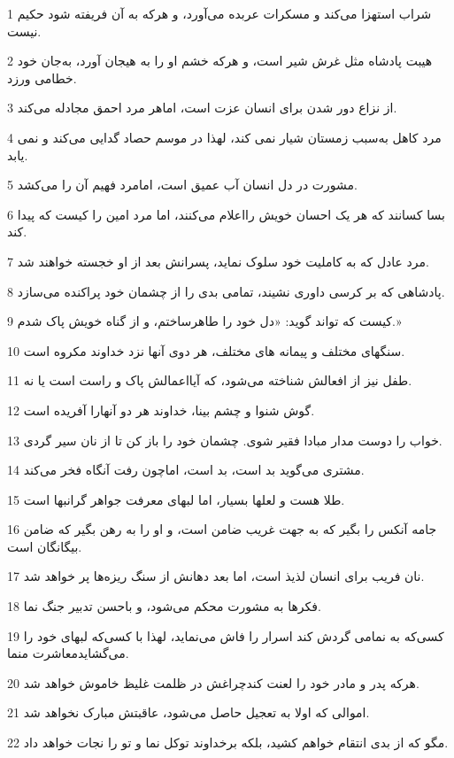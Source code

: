 \par 1 شراب استهزا می‌کند و مسکرات عربده می‌آورد، و هر‌که به آن فریفته شود حکیم نیست.
\par 2 هیبت پادشاه مثل غرش شیر است، و هر‌که خشم او را به هیجان آورد، به‌جان خود خطامی ورزد.
\par 3 از نزاع دور شدن برای انسان عزت است، اماهر مرد احمق مجادله می‌کند.
\par 4 مرد کاهل به‌سبب زمستان شیار نمی کند، لهذا در موسم حصاد گدایی می‌کند و نمی یابد.
\par 5 مشورت در دل انسان آب عمیق است، امامرد فهیم آن را می‌کشد.
\par 6 بسا کسانند که هر یک احسان خویش رااعلام می‌کنند، اما مرد امین را کیست که پیدا کند.
\par 7 مرد عادل که به کاملیت خود سلوک نماید، پسرانش بعد از او خجسته خواهند شد.
\par 8 پادشاهی که بر کرسی داوری نشیند، تمامی بدی را از چشمان خود پراکنده می‌سازد.
\par 9 کیست که تواند گوید: «دل خود را طاهرساختم، و از گناه خویش پاک شدم.»
\par 10 سنگهای مختلف و پیمانه های مختلف، هر دوی آنها نزد خداوند مکروه است.
\par 11 طفل نیز از افعالش شناخته می‌شود، که آیااعمالش پاک و راست است یا نه.
\par 12 گوش شنوا و چشم بینا، خداوند هر دو آنهارا آفریده است.
\par 13 خواب را دوست مدار مبادا فقیر شوی. چشمان خود را باز کن تا از نان سیر گردی.
\par 14 مشتری می‌گوید بد است، بد است، اماچون رفت آنگاه فخر می‌کند.
\par 15 طلا هست و لعلها بسیار، اما لبهای معرفت جواهر گرانبها است.
\par 16 جامه آنکس را بگیر که به جهت غریب ضامن است، و او را به رهن بگیر که ضامن بیگانگان است.
\par 17 نان فریب برای انسان لذیذ است، اما بعد دهانش از سنگ ریزه‌ها پر خواهد شد.
\par 18 فکرها به مشورت محکم می‌شود، و باحسن تدبیر جنگ نما.
\par 19 کسی‌که به نمامی گردش کند اسرار را فاش می‌نماید، لهذا با کسی‌که لبهای خود را می‌گشایدمعاشرت منما.
\par 20 هر‌که پدر و مادر خود را لعنت کندچراغش در ظلمت غلیظ خاموش خواهد شد.
\par 21 اموالی که اولا به تعجیل حاصل می‌شود، عاقبتش مبارک نخواهد شد.
\par 22 مگو که از بدی انتقام خواهم کشید، بلکه برخداوند توکل نما و تو را نجات خواهد داد.
